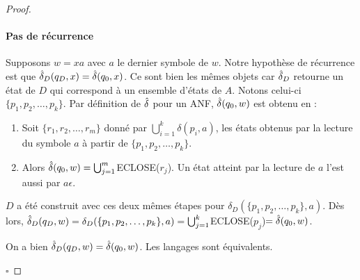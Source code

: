 \begin{proof}
	\paragraph{Pas de récurrence} Supposons $w=xa$ avec $a$ le dernier symbole de $w$. Notre hypothèse de récurrence est que $\hat{\delta}_D(q_D,x)=\hat{\delta}(q_0,x)$. Ce sont bien les mêmes objets car $\hat{\delta}_D$ retourne un état de $D$ qui correspond à un ensemble d'états de $A$. Notons celui-ci $\{p_1,p_2, \dots, p_k\}$. Par définition de $\hat{\delta}$ pour un ANF, $\hat{\delta}(q_0,w)$ est obtenu en :

	\begin{enumerate}
		\item Soit $\{r_1,r_2,\dots, r_m\}$ donné par $\bigcup_{i=1}^k \delta(p_i,a)$, les états obtenus par la lecture du symbole $a$ à partir de $\{p_1,p_2,\dots,p_k\}$.
		\item Alors $\hat{\delta}(q_0,w)=\bigcup_{j=1}^m$ECLOSE($r_j$). Un état atteint par la lecture de $a$ l'est aussi par $a\epsilon$.
	\end{enumerate}

	$D$ a été construit avec ces deux mêmes étapes pour $\delta_D(\{p_1,p_2,\dots, p_k\},a)$. Dès lors, $\hat{\delta}_D(q_D,w)=\delta_D(\{p_1,p_2,\dots, p_k\},a)=\bigcup_{j=1}^k$ECLOSE($p_j$)$=\hat{\delta}(q_0,w)$.

	On a bien $\hat{\delta}_D(q_D,w)=\hat{\delta}(q_0,w)$. Les langages sont équivalents.

	\hfill$\square$
\end{proof}


